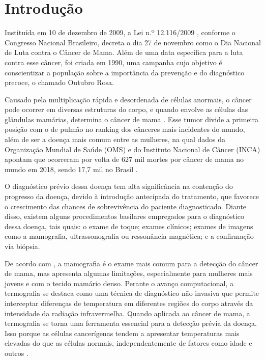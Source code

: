 
\section{\esp Introdução} \label{intro}

Instituída em 10 de dezembro de 2009, a Lei n.º 12.116/2009 , conforme o Congresso Nacional Brasileiro, decreta o dia 27 de novembro como o Dia Nacional de Luta contra o Câncer de Mama. Além de uma data específica para a luta contra esse câncer, foi criada em 1990, uma campanha cujo objetivo é conscientizar a população sobre a importância da prevenção e do diagnóstico precoce, o chamado Outubro Rosa.

Causado pela multiplicação rápida e desordenada de células anormais, o câncer pode ocorrer em diversas estruturas do corpo, e quando envolve as células das glândulas mamárias, determina o câncer de mama \cite{incaoquee}. Esse tumor divide a primeira posição com o de pulmão no ranking dos cânceres mais incidentes do mundo, além de ser a doença mais comum entre as mulheres, na qual dados da Organização Mundial de Saúde (OMS) e do Instituto Nacional de Câncer (INCA) apontam que ocorreram por volta de 627 mil mortes por câncer de mama no mundo em 2018, sendo 17,7 mil no Brasil \cite{boletimepidemiologico}.


O diagnóstico prévio dessa doença tem alta significância na contenção do progresso da doença, devido à introdução antecipada do tratamento, que favorece o crescimento das chances de sobrevivência do paciente diagnosticado. Diante disso, existem alguns procedimentos basilares empregados para o diagnóstico dessa doença, tais quais: o exame de toque; exames clínicos; exames de imagens como a mamografia, ultrassonografia ou ressonância magnética; e a confirmação via biópsia.

De acordo com , a mamografia é o exame mais comum para a detecção do câncer de mama, mas apresenta algumas limitações, especialmente para mulheres mais jovens e com o tecido mamário denso. Perante o avanço computacional, a termografia se destaca como uma técnica de diagnóstico não invasiva que permite interceptar diferenças de temperatura em diferentes regiões do corpo através da intensidade da radiação infravermelha. Quando aplicada ao câncer de mama, a termografia se torna uma ferramenta essencial para a detecção prévia da doença. Isso porque as células cancerígenas tendem a apresentar temperaturas mais elevadas do que as células normais, independentemente de fatores como idade e outros \cite{leles}.

